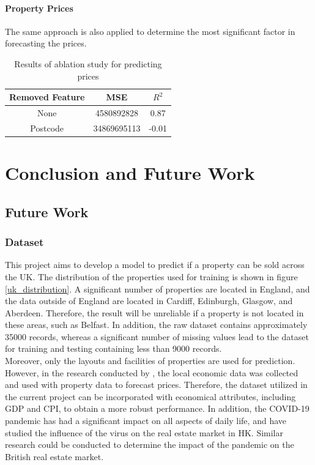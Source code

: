 \documentclass[12pt,twoside]{report}
\begin{document}
\subsubsection{Property Prices}
The same approach is also applied to determine the most significant factor in forecasting the prices. 

\begin{table}[H]
	\centering
	\caption{Results of ablation study for predicting prices}
	\label{ablation_price}
	\begin{tabular}{| c | c | c |}
		\hline
		Removed Feature & MSE & $R^2$ \\
		\hline
		None & 4580892828 & 0.87 \\
		\hline
		Postcode & 34869695113 & -0.01 \\
		\hline
	\end{tabular}
\end{table}

\chapter{Conclusion and Future Work}
\section{Future Work}
\subsection{Dataset}
This project aims to develop a model to predict if a property can be sold across the UK. The distribution of the properties used for training is shown in figure \ref{uk_distribution}. A significant number of properties are located in England, and the data outside of England are located in Cardiff, Edinburgh, Glasgow, and Aberdeen. Therefore, the result will be unreliable if a property is not located in these areas, such as Belfast. In addition, the raw dataset contains approximately 35000 records, whereas a significant number of missing values lead to the dataset for training and testing containing less than 9000 records.
\\

Moreover, only the layouts and facilities of properties are used for prediction. However, in the research conducted by \citet{RN20}, the local economic data was collected and used with property data to forecast prices. Therefore, the dataset utilized in the current project can be incorporated with economical attributes, including GDP and CPI, to obtain a more robust performance. In addition, the COVID-19 pandemic has had a significant impact on all aspects of daily life, and \citet{RN24} have studied the influence of the virus on the real estate market in HK. Similar research could be conducted to determine the impact of the pandemic on the British real estate market. 
\\
\end{document}
